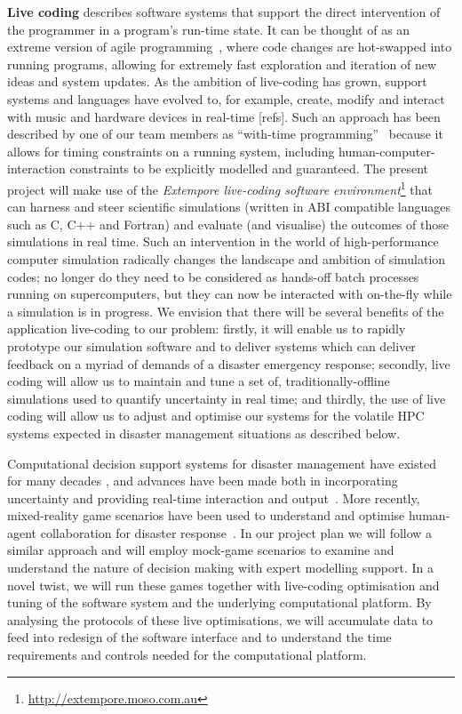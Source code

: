 {\bf Live coding} describes software systems that support the direct
intervention of the programmer in a program’s run-time state. It can
be thought of as an extreme version of agile
programming~\parencite{fowlerAgile2001}, where code changes are
hot-swapped into running programs, allowing for extremely fast
exploration and iteration of new ideas and system updates. As the
ambition of live-coding has grown, support systems and languages have
evolved to, for example, create, modify and interact with music and
hardware devices in real-time [refs]. Such an approach has been
described by one of our team members as ``with-time
programming''~\parencite{sorensen2010programming} because it allows
for timing constraints on a running system, including
human-computer-interaction constraints to be explicitly modelled and
guaranteed. The present project will make use of the {\em Extempore
  live-coding software
  environment}\footnote{\url{http://extempore.moso.com.au}} that can
harness and steer scientific simulations (written in ABI compatible
languages such as C, C++ and Fortran) and evaluate (and visualise) the
outcomes of those simulations in real time. Such an intervention in
the world of high-performance computer simulation radically changes
the landscape and ambition of simulation codes; no longer do they need
to be considered as hands-off batch processes running on
supercomputers, but they can now be interacted with on-the-fly while a
simulation is in progress. We envision that there will be several
benefits of the application live-coding to our problem: firstly, it
will enable us to rapidly prototype our simulation software and to
deliver systems which can deliver feedback on a myriad of demands of a
disaster emergency response; secondly, live coding will allow us to
maintain and tune a set of, traditionally-offline simulations used to
quantify uncertainty in real time; and thirdly, the use of live coding
will allow us to adjust and optimise our systems for the volatile HPC
systems expected in disaster management situations as described below.

Computational decision support systems for disaster management have
existed for many decades \parencite{wallaceDecision1985}, and
advances have been made both in incorporating
uncertainty \parencite{thompsonSocial2014,nealeNavigating2015}
and providing real-time interaction and
output~\parencite{yuSupport2006}. More recently, mixed-reality game
scenarios have been used to understand and optimise human-agent
collaboration for disaster response~\parencite{ramchurn2016human}. In
our project plan we will follow a similar approach and will employ
mock-game scenarios to examine and understand the nature of decision
making with expert modelling support. In a novel twist, we will run
these games together with live-coding optimisation and tuning of the
software system and the underlying computational platform. By
analysing the protocols of these live optimisations, we will
accumulate data to feed into redesign of the software interface and to
understand the time requirements and controls needed for the
computational platform.


